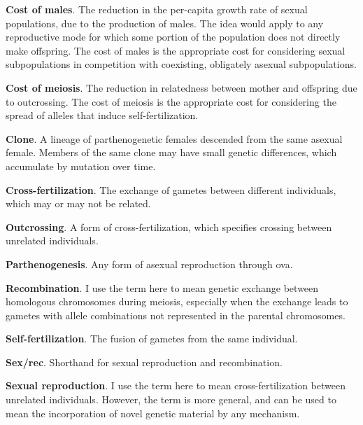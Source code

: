 \documentclass[
  11pt,
  letterpaper,
]{scrbook}
\begin{document}
\begin{tcolorbox}[enhanced jigsaw, opacityback=0, bottomrule=.15mm, title=\textcolor{quarto-callout-tip-color}{\faLightbulb}\hspace{0.5em}{Short definitions of terms, as used in this book. These definitions do
not include all possible nuances for the terms.}, toprule=.15mm, colframe=quarto-callout-tip-color-frame, rightrule=.15mm, breakable, coltitle=black, opacitybacktitle=0.6, titlerule=0mm, colback=white, leftrule=.75mm, bottomtitle=1mm, left=2mm, toptitle=1mm, colbacktitle=quarto-callout-tip-color!10!white, arc=.35mm]

\textbf{Cost of males}. The reduction in the per-capita growth rate of
sexual populations, due to the production of males. The idea would apply
to any reproductive mode for which some portion of the population does
not directly make offspring. The cost of males is the appropriate cost
for considering sexual subpopulations in competition with coexisting,
obligately asexual subpopulations.

\textbf{Cost of meiosis}. The reduction in relatedness between mother
and offspring due to outcrossing. The cost of meiosis is the appropriate
cost for considering the spread of alleles that induce
self-fertilization.

\textbf{Clone}. A lineage of parthenogenetic females descended from the
same asexual female. Members of the same clone may have small genetic
differences, which accumulate by mutation over time.

\textbf{Cross-fertilization}. The exchange of gametes between different
individuals, which may or may not be related.

\textbf{Outcrossing}. A form of cross-fertilization, which specifies
crossing between unrelated individuals.

\textbf{Parthenogenesis}. Any form of asexual reproduction through ova.

\textbf{Recombination}. I use the term here to mean genetic exchange
between homologous chromosomes during meiosis, especially when the
exchange leads to gametes with allele combinations not represented in
the parental chromosomes.

\textbf{Self-fertilization}. The fusion of gametes from the same
individual.

\textbf{Sex/rec}. Shorthand for sexual reproduction and recombination.

\textbf{Sexual reproduction}. I use the term here to mean
cross-fertilization between unrelated individuals. However, the term is
more general, and can be used to mean the incorporation of novel genetic
material by any mechanism.

\end{tcolorbox}
\end{document}
